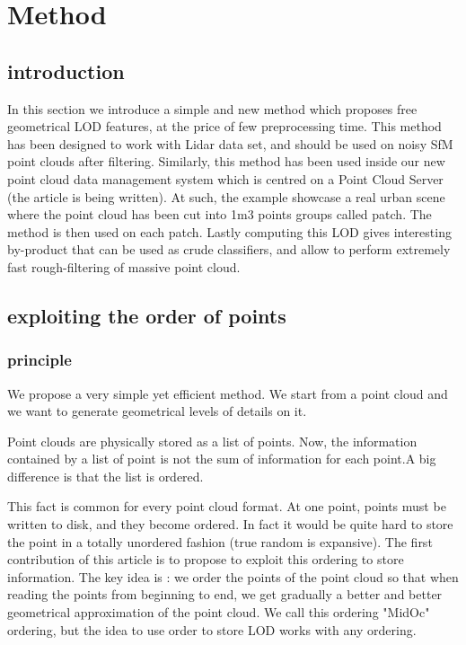 

\section{Method}
	\subsection{introduction}
	 	In this section we introduce a simple and new method which proposes free geometrical LOD features, at the price of few preprocessing time.
	 	This method has been designed to work with Lidar data set, and should be used on noisy SfM point clouds after filtering.
	 	Similarly, this method has been used inside our new point cloud data management system which is centred on a Point Cloud Server (the article is being written).
	 	At such, the example showcase a real urban scene where the point cloud has been cut into 1m3 points groups called patch.
	 	The method is then used on each patch.
	 	Lastly computing this LOD gives interesting by-product that can be used as crude classifiers, and allow to perform extremely fast rough-filtering of massive point cloud. 
	 	 
	\subsection{exploiting the order of points }
		\subsubsection{principle}
			We propose a very simple yet efficient method.
			We start from a point cloud and we want to generate geometrical levels of details on it.
			
			Point clouds are physically stored as a list of points. 
			Now, the information contained by a list of point is not the sum of information for each point.A big difference is that the list is ordered.
			
			This fact is common for every point cloud format. At one point, points must be written to disk, and they become ordered. In fact it would be quite hard to store the point in a totally unordered fashion (true random is expansive).
			The first contribution of this article is to propose to exploit this ordering to store information.
			The key idea is : we order the points of the point cloud so that when reading the points from beginning to end, we get gradually a better and better geometrical approximation of the point cloud. We call this ordering "MidOc" ordering, but the idea to use order to store LOD works with any ordering.
			
